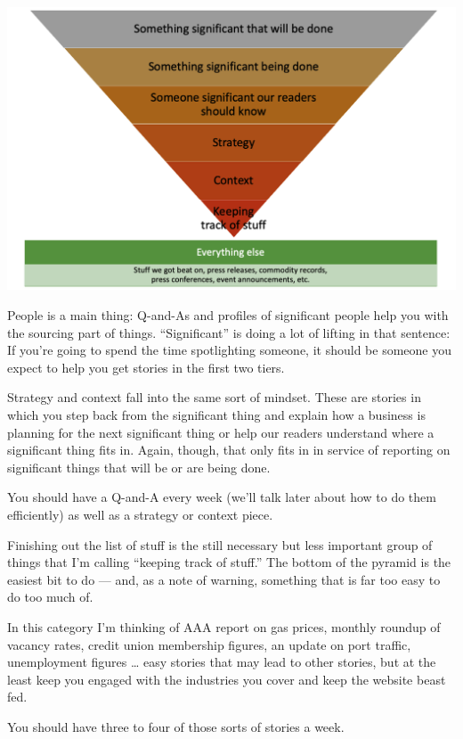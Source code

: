 \documentclass[
  11pt,
  american,
  letterpaperpaper,
  extrafontsizes,onecolumn,openright
  ]{memoir}
\begin{document}
\scriptsize

\begin{center}\includegraphics[width=0.8\linewidth]{images/story_hierarchy} \end{center}

\normalsize
People is a main thing: Q-and-As and profiles of significant people help you with the sourcing part of things. \enquote{Significant} is doing a lot of lifting in that sentence: If you're going to spend the time spotlighting someone, it should be someone you expect to help you get stories in the first two tiers.

Strategy and context fall into the same sort of mindset. These are stories in which you step back from the significant thing and explain how a business is planning for the next significant thing or help our readers understand where a significant thing fits in. Again, though, that only fits in in service of reporting on significant things that will be or are being done.

You should have a Q-and-A every week (we'll talk later about how to do them efficiently) as well as a strategy or context piece.

Finishing out the list of stuff is the still necessary but less important group of things that I'm calling \enquote{keeping track of stuff.} The bottom of the pyramid is the easiest bit to do --- and, as a note of warning, something that is far too easy to do too much of.

In this category I'm thinking of AAA report on gas prices, monthly roundup of vacancy rates, credit union membership figures, an update on port traffic, unemployment figures \ldots{} easy stories that may lead to other stories, but at the least keep you engaged with the industries you cover and keep the website beast fed.

You should have three to four of those sorts of stories a week.
\end{document}
